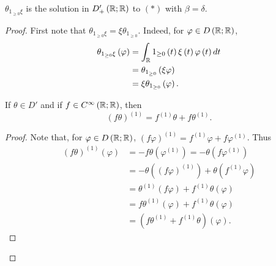 \begin{remark}
	$\theta _{1 _{\ge  0}\xi}$ is the solution in $D'_{+}\left( \mathbb{R}; \mathbb{R} \right) $ to $\left( * \right) $ with $\beta = \delta$. 
\begin{proof}
	First note that $\theta _{1 _{\ge  0}\xi} = \xi \theta _{1 _{\ge  0}}$. Indeed, for $\varphi \in  D\left( \mathbb{R}; \mathbb{R} \right) $, 
	\begin{align*}
		\theta _{1 _{\ge  0}\xi}\left( \varphi \right)  &= \int_{\mathbb{R}}^{ } 1 _{\ge 0}\left( t  \right) \xi\left( t \right) \varphi\left( t \right)  dt\\
								&= \theta _{1 _{\ge  0}}\left( \xi\varphi \right)  \\ 
								&= \xi\theta_{1 _{\ge 0}}\left( \varphi \right) 
	.\end{align*}
\begin{fact}
	If $\theta \in  D'$ and if $f \in C^{\infty}\left( \mathbb{R}; \mathbb{R} \right) $, then 
	\[
		\left( f \theta  \right) ^{\left( 1 \right) } = f ^{ \left( 1 \right) } \theta + f \theta ^{ \left( 1 \right) }
	.\] 
\end{fact}
\begin{proof}
	Note that, for $\varphi \in  D\left( \mathbb{R}; \mathbb{R} \right) $, $\left( f \varphi \right) ^{\left( 1 \right) } = f ^{ \left( 1 \right) } \varphi + f \varphi ^{ \left( 1 \right) }$. Thus 
	\begin{align*}
		\left( f \theta \right) ^{\left( 1 \right) } \left( \varphi \right)  &=  - f \theta \left( \varphi ^{\left( 1 \right) } \right)  = -\theta \left( f \varphi^{ \left( 1 \right) } \right)  \\
										     &= - \theta \left( \left( f \varphi  \right) ^{ \left( 1 \right) } \right)  + \theta\left( f ^{ \left( 1 \right) } \varphi \right)  \\
										     &= \theta ^{ \left( 1 \right) } \left( f \varphi \right)  + f ^{ \left( 1 \right) }\theta \left( \varphi \right)  \\
										     &= f \theta ^{ \left( 1 \right) } \left(  \varphi \right)  + f ^{ \left( 1 \right) } \theta \left( \varphi \right)  \\
										     &= \left( f \theta ^{\left( 1 \right) } + f ^{ \left( 1 \right) } \theta  \right) \left( \varphi \right) 
	.\end{align*}
\end{proof}


\end{proof}
\end{remark}
